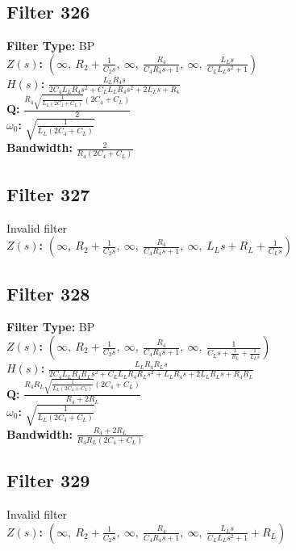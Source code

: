 \documentclass{article}
\begin{document}
\subsection*{Filter 326}
\textbf{Filter Type:} BP \\ 
\textbf{$Z(s)$:} $\left( \infty, \  R_{2} + \frac{1}{C_{2} s}, \  \infty, \  \frac{R_{4}}{C_{4} R_{4} s + 1}, \  \infty, \  \frac{L_{L} s}{C_{L} L_{L} s^{2} + 1}\right)$ \\ 
\textbf{$H(s)$:} $\frac{L_{L} R_{4} s}{2 C_{4} L_{L} R_{4} s^{2} + C_{L} L_{L} R_{4} s^{2} + 2 L_{L} s + R_{4}}$ \\ 
\textbf{Q:} $\frac{R_{4} \sqrt{\frac{1}{L_{L} \left(2 C_{4} + C_{L}\right)}} \left(2 C_{4} + C_{L}\right)}{2}$ \\ 
\textbf{$\omega_0$:} $\sqrt{\frac{1}{L_{L} \left(2 C_{4} + C_{L}\right)}}$ \\ 
\textbf{Bandwidth:} $\frac{2}{R_{4} \left(2 C_{4} + C_{L}\right)}$ \\ 
\subsection*{Filter 327}
Invalid filter \\ 
\textbf{$Z(s)$:} $\left( \infty, \  R_{2} + \frac{1}{C_{2} s}, \  \infty, \  \frac{R_{4}}{C_{4} R_{4} s + 1}, \  \infty, \  L_{L} s + R_{L} + \frac{1}{C_{L} s}\right)$ \\ 
\subsection*{Filter 328}
\textbf{Filter Type:} BP \\ 
\textbf{$Z(s)$:} $\left( \infty, \  R_{2} + \frac{1}{C_{2} s}, \  \infty, \  \frac{R_{4}}{C_{4} R_{4} s + 1}, \  \infty, \  \frac{1}{C_{L} s + \frac{1}{R_{L}} + \frac{1}{L_{L} s}}\right)$ \\ 
\textbf{$H(s)$:} $\frac{L_{L} R_{4} R_{L} s}{2 C_{4} L_{L} R_{4} R_{L} s^{2} + C_{L} L_{L} R_{4} R_{L} s^{2} + L_{L} R_{4} s + 2 L_{L} R_{L} s + R_{4} R_{L}}$ \\ 
\textbf{Q:} $\frac{R_{4} R_{L} \sqrt{\frac{1}{L_{L} \left(2 C_{4} + C_{L}\right)}} \left(2 C_{4} + C_{L}\right)}{R_{4} + 2 R_{L}}$ \\ 
\textbf{$\omega_0$:} $\sqrt{\frac{1}{L_{L} \left(2 C_{4} + C_{L}\right)}}$ \\ 
\textbf{Bandwidth:} $\frac{R_{4} + 2 R_{L}}{R_{4} R_{L} \left(2 C_{4} + C_{L}\right)}$ \\ 
\subsection*{Filter 329}
Invalid filter \\ 
\textbf{$Z(s)$:} $\left( \infty, \  R_{2} + \frac{1}{C_{2} s}, \  \infty, \  \frac{R_{4}}{C_{4} R_{4} s + 1}, \  \infty, \  \frac{L_{L} s}{C_{L} L_{L} s^{2} + 1} + R_{L}\right)$ \\ 
\end{document}
